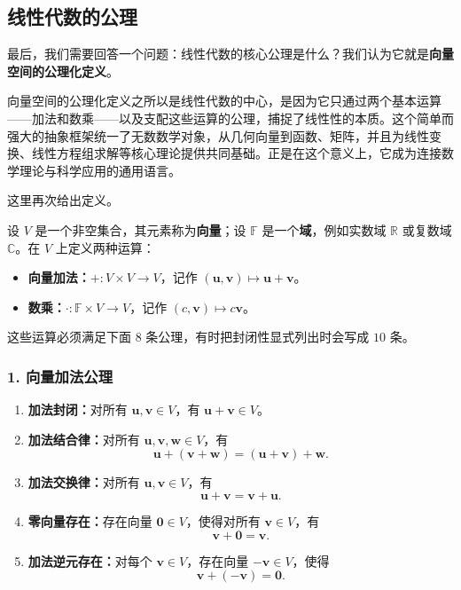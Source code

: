 \subsection{线性代数的公理}
最后，我们需要回答一个问题：线性代数的核心公理是什么？我们认为它就是\textbf{向量空间的公理化定义}。

向量空间的公理化定义之所以是线性代数的中心，是因为它只通过两个基本运算——加法和数乘——以及支配这些运算的公理，捕捉了线性性的本质。这个简单而强大的抽象框架统一了无数数学对象，从几何向量到函数、矩阵，并且为线性变换、线性方程组求解等核心理论提供共同基础。正是在这个意义上，它成为连接数学理论与科学应用的通用语言。

这里再次给出定义。

设 $V$ 是一个非空集合，其元素称为\textbf{向量}；设 $\mathbb{F}$ 是一个\textbf{域}，例如实数域 $\mathbb{R}$ 或复数域 $\mathbb{C}$。在 $V$ 上定义两种运算：
\begin{itemize}
    \item \textbf{向量加法：}$+:V\times V\to V$，记作 $(\mathbf{u},\mathbf{v})\mapsto\mathbf{u}+\mathbf{v}$。
    \item \textbf{数乘：}$\cdot:\mathbb{F}\times V\to V$，记作 $(c,\mathbf{v})\mapsto c\mathbf{v}$。
\end{itemize}

这些运算必须满足下面 $8$ 条公理，有时把封闭性显式列出时会写成 $10$ 条。

\subsubsection*{1. 向量加法公理}
\begin{enumerate}
    \item \textbf{加法封闭：}对所有 $\mathbf{u},\mathbf{v}\in V$，有 $\mathbf{u}+\mathbf{v}\in V$。
    \item \textbf{加法结合律：}对所有 $\mathbf{u},\mathbf{v},\mathbf{w}\in V$，有
    \[
    \mathbf{u}+(\mathbf{v}+\mathbf{w})=(\mathbf{u}+\mathbf{v})+\mathbf{w}.
    \]
    \item \textbf{加法交换律：}对所有 $\mathbf{u},\mathbf{v}\in V$，有
    \[
    \mathbf{u}+\mathbf{v}=\mathbf{v}+\mathbf{u}.
    \]
    \item \textbf{零向量存在：}存在向量 $\mathbf{0}\in V$，使得对所有 $\mathbf{v}\in V$，有
    \[
    \mathbf{v}+\mathbf{0}=\mathbf{v}.
    \]
    \item \textbf{加法逆元存在：}对每个 $\mathbf{v}\in V$，存在向量 $-\mathbf{v}\in V$，使得
    \[
    \mathbf{v}+(-\mathbf{v})=\mathbf{0}.
    \]
\end{enumerate}

